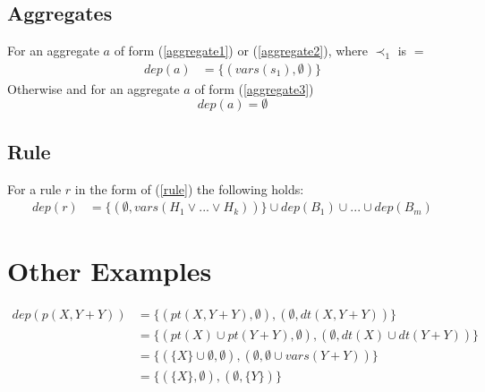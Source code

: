 \documentclass{article}
\newcommand{\set}[1]{\{#1\}}
\newcommand{\dep}[2]{\{(#1), (#2)\}}
\begin{document}
	\subsection{Aggregates}
	For an aggregate $a$ of form (\ref{aggregate1}) or (\ref{aggregate2}), where $\prec_1$ is $=$
	\begin{align*}
		dep(a) &= \set{(vars(s_1), \emptyset)}
	\end{align*}
	Otherwise and for an aggregate $a$ of form (\ref{aggregate3})
	\begin{equation*}
		dep(a) = \emptyset
	\end{equation*}

	\subsection{Rule}
	For a rule $r$ in the form of (\ref{rule}) the following holds:
	\begin{align*}
		dep(r) &= \set{(\emptyset, vars(H_1\vee ... \vee H_k))} \cup dep(B_1) \cup ... \cup dep(B_m)
	\end{align*}

	\section{Other Examples}
	\begin{align*}
		dep(p(X,Y+Y)) &= \dep{pt(X,Y+Y), \emptyset}{\emptyset, dt(X,Y+Y)}
		\\ &= \dep{pt(X) \cup pt(Y+Y), \emptyset}{\emptyset, dt(X) \cup dt(Y+Y)}
		\\ &= \dep{\set{X} \cup \emptyset, \emptyset}{\emptyset, \emptyset \cup vars(Y+Y)}
		\\ &= \dep{\set{X}, \emptyset}{\emptyset, \set{Y}}
	\end{align*}
\end{document}
